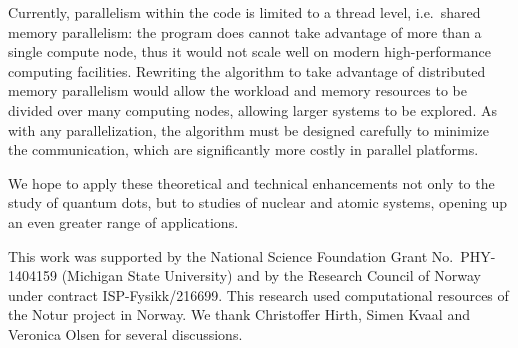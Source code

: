 Currently, parallelism within the code is limited to a thread level, i.e.\ shared memory parallelism: the program does cannot take advantage of more than a single compute node, thus it would not scale well on modern high-performance computing facilities.  Rewriting the algorithm to take advantage of distributed memory parallelism would allow the workload and memory resources to be divided over many computing nodes, allowing larger systems to be explored.  As with any parallelization, the algorithm must be designed carefully to minimize the communication, which are significantly more costly in parallel platforms.

We hope to apply these theoretical and technical enhancements not only to the study of quantum dots, but to studies of nuclear and atomic systems, opening up an even greater range of applications.

\begin{acknowledgments}
  This work was supported by the National Science Foundation Grant No.\ PHY-1404159 (Michigan State University) and by the Research Council of Norway under contract ISP-Fysikk/216699.  This research used computational resources of the Notur project in Norway.  We thank Christoffer Hirth, Simen Kvaal and Veronica Olsen for several discussions.
\end{acknowledgments}




